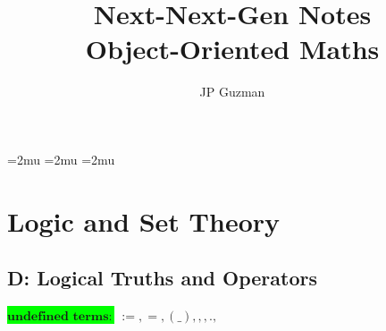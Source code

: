 \documentclass[a4paper]{article}
\title{Next-Next-Gen Notes \\
\large Object-Oriented Maths}
\author{JP Guzman}
\newcommand{\tdb}[1]{\colorbox{lime}{$\displaystyle #1$}}
\newcommand{\defeq}{:=}
\newcommand{\eq}{=}
\newcommand{\cusand}{,}
\newcommand{\cusend}{.}
\begin{document}
\maketitle
\allowdisplaybreaks


\thinmuskip=2mu %
\medmuskip=2mu %
\thickmuskip=2mu %
\setlength{\belowdisplayskip}{0pt} \setlength{\belowdisplayshortskip}{0pt}
\setlength{\abovedisplayskip}{0pt} \setlength{\abovedisplayshortskip}{0pt}



\section{Logic and Set Theory}
\subsection{D: Logical Truths and Operators}
\tdb{\textbf{undefined terms}:} $%
   \defeq, %
   \eq, %
   (\_), %
   \cusand, %
   \cusend, %
$
\end{document}
